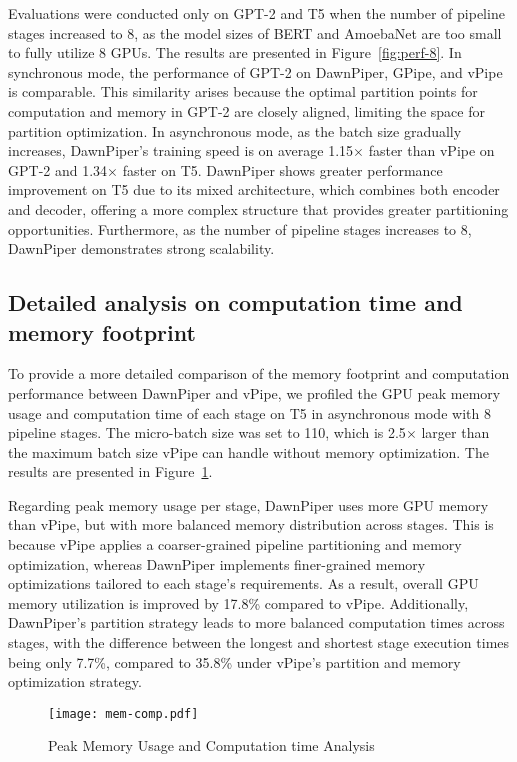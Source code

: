 Evaluations were conducted only on GPT-2 and T5 when the number of pipeline stages increased to 8,
as the model sizes of BERT and AmoebaNet are too small to fully utilize 8 GPUs.
The results are presented in Figure~\ref{fig:perf-8}.
In synchronous mode, the performance of GPT-2 on DawnPiper, GPipe, and vPipe is comparable.
This similarity arises because the optimal partition points for computation and memory in GPT-2 are closely aligned,
limiting the space for partition optimization.
In asynchronous mode, as the batch size gradually increases,
DawnPiper's training speed is on average 1.15$\times$ faster than vPipe on GPT-2 and 1.34$\times$ faster on T5.
DawnPiper shows greater performance improvement on T5 due to its mixed architecture,
which combines both encoder and decoder,
offering a more complex structure that provides greater partitioning opportunities.
Furthermore, as the number of pipeline stages increases to 8, DawnPiper demonstrates strong scalability.

\subsection{Detailed analysis on computation time and memory footprint}
To provide a more detailed comparison of the memory footprint and computation performance between DawnPiper and vPipe,
we profiled the GPU peak memory usage and computation time of each stage on T5 in asynchronous mode with 8 pipeline stages.
The micro-batch size was set to 110, which is 2.5$\times$ larger
than the maximum batch size vPipe can handle without memory optimization.
The results are presented in Figure~\ref{fig:mem-comp}.

Regarding peak memory usage per stage, DawnPiper uses more GPU memory than vPipe,
but with more balanced memory distribution across stages.
This is because vPipe applies a coarser-grained pipeline partitioning and memory optimization,
whereas DawnPiper implements finer-grained memory optimizations tailored to each stage’s requirements.
As a result, overall GPU memory utilization is improved by 17.8\% compared to vPipe.
Additionally, DawnPiper’s partition strategy leads to more balanced computation times across stages,
with the difference between the longest and shortest stage execution times being only 7.7\%,
compared to 35.8\% under vPipe’s partition and memory optimization strategy.
\begin{figure}
  \centering
  \texttt{[image: mem-comp.pdf]}
  \caption{Peak Memory Usage and Computation time Analysis}
  \label{fig:mem-comp}
\end{figure}
